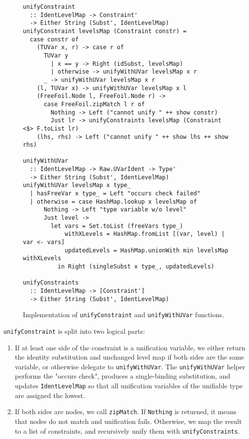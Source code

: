 \begin{figure}[H]
\begin{verbatim}
unifyConstraint
  :: IdentLevelMap -> Constraint'
  -> Either String (Subst', IdentLevelMap)
unifyConstraint levelsMap (Constraint constr) =
  case constr of
    (TUVar x, r) -> case r of
      TUVar y
        | x == y -> Right (idSubst, levelsMap)
        | otherwise -> unifyWithUVar levelsMap x r
      _ -> unifyWithUVar levelsMap x r
    (l, TUVar x) -> unifyWithUVar levelsMap x l
    (FreeFoil.Node l, FreeFoil.Node r) ->
      case FreeFoil.zipMatch l r of
        Nothing -> Left ("cannot unify " ++ show constr)
        Just lr -> unifyConstraints levelsMap (Constraint <$> F.toList lr)
    (lhs, rhs) -> Left ("cannot unify " ++ show lhs ++ show rhs)

unifyWithUVar
  :: IdentLevelMap -> Raw.UVarIdent -> Type'
  -> Either String (Subst', IdentLevelMap)
unifyWithUVar levelsMap x type_
  | hasFreeVar x type_ = Left "occurs check failed"
  | otherwise = case HashMap.lookup x levelsMap of
      Nothing -> Left "type variable w/o level"
      Just level ->
        let vars = Set.toList (freeVars type_)
            withXLevels = HashMap.fromList [(var, level) | var <- vars]
            updatedLevels = HashMap.unionWith min levelsMap withXLevels
          in Right (singleSubst x type_, updatedLevels)

unifyConstraints
  :: IdentLevelMap -> [Constraint']
  -> Either String (Subst', IdentLevelMap)        
\end{verbatim}
  \caption[Implementation of \texttt{unifyConstraint}]{Implementation of \texttt{unifyConstraint} and \texttt{unifyWithUVar} functions.}
  \label{fig:unification-impl}
\end{figure}

\texttt{unifyConstraint} is split into two logical parts:

\begin{enumerate}
  \item If at least one side of the constraint is a unification variable, we either return the identity substitution and unchanged level map if both sides are the same variable, or otherwise delegate to \texttt{unifyWithUVar}. The \texttt{unifyWithUVar} helper performs the "occurs check", produces a single-binding substitution, and updates \texttt{IdentLevelMap} so that all unification variables of the unifiable type are assigned the lowest.
  \item If both sides are nodes, we call \texttt{zipMatch}. If \texttt{Nothing} is returned, it means that nodes do not match and unification fails. Otherwise, we map the result to a list of constraints, and recursively unify them with \texttt{unifyConstraints}.
\end{enumerate}

